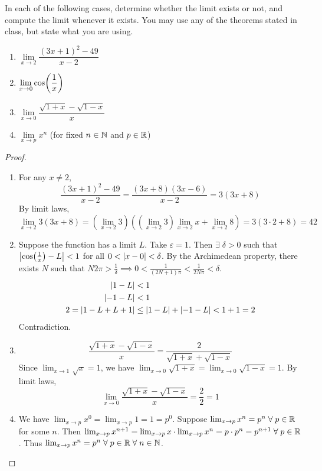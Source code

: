 \documentclass[12pt]{article}
\begin{document}
\begin{problem}
    In each of the following cases, determine whether the limit exists or not, and compute the limit whenever it exists.
    You may use any of the theorems stated in class, but state what you are using.
    \begin{enumerate}[label=(\alph*)]
        \item $\lim\limits_{x \to 2} \dfrac{(3x + 1)^{2} - 49}{x - 2}$
        \item $\lim\limits_{x \to 0} \cos\paren{\dfrac{1}{x}}$
        \item $\lim\limits_{x \to 0} \dfrac{\sqrt{1 + x} - \sqrt{1 - x}}{x}$
        \item $\lim\limits_{x \to p} x^{n}$ (for fixed $n \in \mathbb{N}$ and $p \in \mathbb{R}$)
    \end{enumerate}
\end{problem}
\begin{proof}
    \begin{enumerate}[label=(\alph*)]
        \item For any $x \neq  2$, \[
            \frac{(3x + 1)^{2} - 49}{x - 2} = \frac{(3x + 8)(3x - 6)}{x - 2} = 3(3x + 8)
        \] By limit laws, \[
            \lim_{x \to 2} 3(3x + 8) = (\lim_{x \to 2} 3) ((\lim_{x \to 2} 3) \lim_{x \to 2} x + \lim_{x \to 2} 8) = 3(3 \cdot 2 + 8) = 42
        \]
    
        \item Suppose the function has a limit $L$.
        Take $\varepsilon = 1$.
        Then $\exists\; \delta > 0$ such that $\abs{\cos \paren{\frac{1}{x}} - L} < 1$ for all $0 < \abs{x - 0} < \delta$.
        By the Archimedean property, there exists $N$ such that $N 2\pi > \frac{1}{\delta} \implies 0 < \frac{1}{(2N + 1)\pi} < \frac{1}{2 N \pi} < \delta$.
        \begin{align*}
            \abs{1 - L} &< 1 \\
            \abs{-1 - L} &< 1 \\
            2 = \abs{1 - L + L + 1} &\leq \abs{1 - L} + \abs{-1 - L} < 1 + 1 = 2
        \end{align*}
        Contradiction.
    
        \item \[
            \frac{\sqrt{1 + x} - \sqrt{1 - x}}{x} = \frac{2}{\sqrt{1 + x} + \sqrt{1 - x}} 
        \] Since $\lim_{x \to 1} \sqrt{x} = 1$, we have $\lim_{x \to 0} \sqrt{1 + x} = \lim_{x \to 0} \sqrt{1 - x} = 1$. By limit laws, \[
            \lim_{x \to 0} \frac{\sqrt{1 + x} - \sqrt{1 - x}}{x} = \frac{2}{2} = 1
        \]
    
        \item We have $\lim_{x \to p} x^{0} = \lim_{x \to p} 1 = 1 = p^{0}$.
        Suppose $\lim_{x \to p} x^{n} = p^{n} \;\forall\; p \in \mathbb{R}$ for some $n$.
        Then $\lim_{x \to p} x^{n + 1} = \lim_{x \to p} x \cdot \lim_{x \to p} x^{n} = p \cdot p^{n} = p^{n + 1} \;\forall\; p \in \mathbb{R}$.
        Thus $\lim_{x \to p} x^{n} = p^{n} \;\forall\; p \in \mathbb{R} \;\forall\; n \in \mathbb{N}$. \qedhere
    \end{enumerate}
\end{proof}
\end{document}

